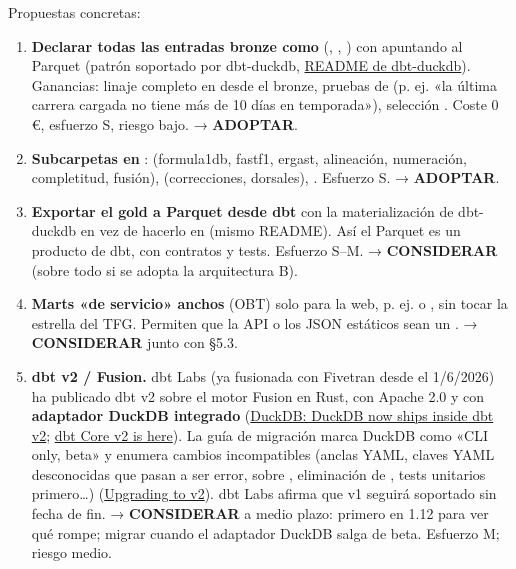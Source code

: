Propuestas concretas:

\begin{enumerate}
\item \textbf{Declarar todas las entradas bronze como } (, , ) con  apuntando al Parquet (patrón soportado por dbt-duckdb, \href{https://github.com/duckdb/dbt-duckdb/blob/master/README.md}{README de dbt-duckdb}). Ganancias: linaje completo en  desde el bronze, pruebas de  (p. ej. «la última carrera cargada no tiene más de 10 días en temporada»), selección . Coste 0 €, esfuerzo S, riesgo bajo. → \textbf{ADOPTAR}.
\item \textbf{Subcarpetas en }:  (formula1db, fastf1, ergast, alineación, numeración, completitud, fusión),  (correcciones, dorsales), . Esfuerzo S. → \textbf{ADOPTAR}.
\item \textbf{Exportar el gold a Parquet desde dbt} con la materialización  de dbt-duckdb en vez de hacerlo en  (mismo README). Así el Parquet es un producto de dbt, con contratos y tests. Esfuerzo S–M. → \textbf{CONSIDERAR} (sobre todo si se adopta la arquitectura B).
\item \textbf{Marts «de servicio» anchos} (OBT) solo para la web, p. ej.  o , sin tocar la estrella del TFG. Permiten que la API o los JSON estáticos sean un . → \textbf{CONSIDERAR} junto con §5.3.
\item \textbf{dbt v2 / Fusion.} dbt Labs (ya fusionada con Fivetran desde el 1/6/2026) ha publicado dbt v2 sobre el motor Fusion en Rust, con Apache 2.0 y con \textbf{adaptador DuckDB integrado} (\href{https://duckdb.org/2026/09/22/dbt-fusion}{DuckDB: DuckDB now ships inside dbt v2}; \href{https://docs.getdbt.com/blog/dbt-core-v2-is-here}{dbt Core v2 is here}). La guía de migración marca DuckDB como «CLI only, beta» y enumera cambios incompatibles (anclas YAML, claves YAML desconocidas que pasan a ser error,  sobre , eliminación de , tests unitarios primero…) (\href{https://docs.getdbt.com/docs/dbt-versions/core-upgrade/upgrading-to-v2}{Upgrading to v2}). dbt Labs afirma que v1 seguirá soportado sin fecha de fin. → \textbf{CONSIDERAR} a medio plazo: primero  en 1.12 para ver qué rompe; migrar cuando el adaptador DuckDB salga de beta. Esfuerzo M; riesgo medio.

\end{enumerate}

